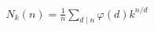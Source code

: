 \documentclass[preview]{standalone}
\begin{document}
\begin{align*}
N_k(n) = \frac 1 n \sum_{d \mid n} \varphi(d)k^{n/d}
\end{align*}
\end{document}
